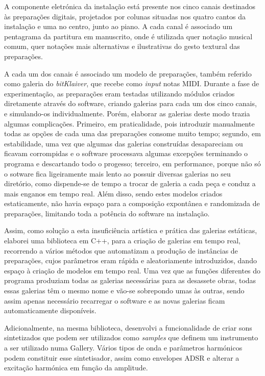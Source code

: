\documentclass[../main.tex]{subfiles}
\begin{document}
A componente eletrónica da instalação está presente nos cinco canais destinados às preparações digitais, projetados por colunas situadas nos quatro cantos da instalação e uma no centro, junto ao piano. A cada canal é associado um pentagrama da partitura em manuscrito, onde é utilizada quer notação musical comum, quer notações mais alternativas e ilustrativas do gesto textural das preparações.

A cada um dos canais é associado um modelo de preparações, também referido como galeria do \textit{bitKlaiver}, que recebe como \textit{input} notas MIDI. Durante a fase de experimentação, as preparações eram testadas utilizando módulos criados diretamente através do software, criando galerias para cada um dos cinco canais, e simulando-os individualmente. Porém, elaborar as galerias deste modo trazia algumas complicações. Primeiro, em praticalidade, pois introduzir manualmente todas as opções de cada uma das preparações consome muito tempo; segundo, em estabilidade, uma vez que algumas das galerias construídas desapareciam ou ficavam corrompidas e o software processava algumas excepções terminando o programa e descartando todo o progesso; terceiro, em performance, porque não só o sotware fica ligeiramente mais lento ao possuir diversas galerias no seu diretório, como dispende-se de tempo a trocar de galeria a cada peça e conduz a mais enganos em tempo real. Além disso, sendo estes modelos criados estaticamente, não havia espaço para a composição expontânea e randomizada de preparações, limitando toda a potência do software na instalação.

Assim, como solução a esta insuficiência artística e prática das galerias estáticas, elaborei uma biblioteca em C++, para a criação de galerias em tempo real, recorrendo a vários métodos que automatizam a produção de instâncias de preparações, cujos parâmetros eram rápida e aleatoriamente introduzidos, dando espaço à criação de modelos em tempo real. Uma vez que as funções diferentes do programa produziam todas as galerias necessárias para as desassete obras, todas essas galerias têm o mesmo nome e vão-se sobrepondo umas às outras, sendo assim apenas necessário recarregar o software e as novas galerias ficam automaticamente disponíveis.

Adicionalmente, na mesma biblioteca, desenvolvi a funcionalidade de criar sons sintetizados que podem ser utilizados como \textit{samples} que definem um instrumento a ser utilizado numa Gallery. Vários tipos de onda e parâmetros harmónicos podem constituir esse sintetisador, assim como envelopes ADSR e alterar a excitação harmónica em função da amplitude.

\inputminted[linenos=true]{cpp}{./eletronics.cpp}
\end{document}
